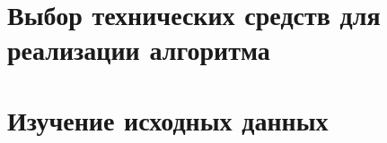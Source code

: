 \section[Выбор технических средств для реализации алгоритма]{Выбор технических средств для реализации алгоритма}



\section[Изучение исходных данных]{Изучение исходных данных}


